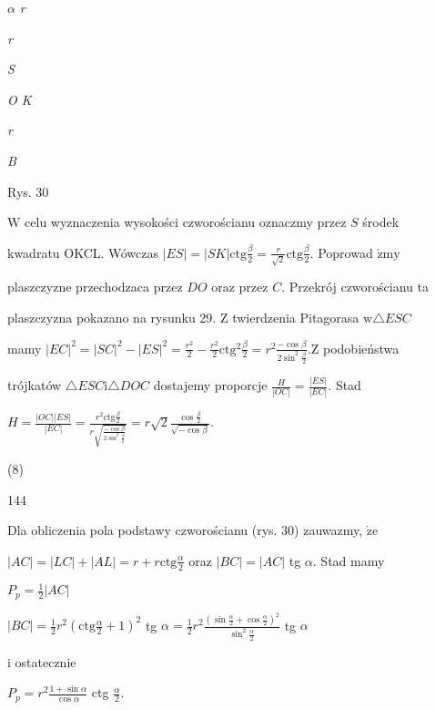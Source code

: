 \documentclass[a4paper,12pt]{article}
\begin{document}
$\alpha$  {\it r}

{\it r}

{\it S}

{\it O K}

{\it r}

{\it B}

Rys. 30

$\mathrm{W}$ celu wyznaczenia wysokości czworościanu oznaczmy przez $S$ środek

kwadratu OKCL. Wówczas $|ES|= |SK|\displaystyle \mathrm{c}\mathrm{t}\mathrm{g}\frac{\beta}{2}=\frac{r}{\sqrt{2}}\mathrm{c}\mathrm{t}\mathrm{g}\frac{\beta}{2}.$ Poprowad $\acute{\mathrm{z}}\mathrm{m}\mathrm{y}$

plaszczyzne przechodzaca przez $DO$ oraz przez $C$. Przekrój czworościanu ta

plaszczyzna pokazano na rysunku 29. $\mathrm{Z}$ twierdzenia Pitagorasa $\mathrm{w}\triangle ESC$

mamy $|EC|^{2}=|SC|^{2}-|ES|^{2}=\displaystyle \frac{r^{2}}{2}-\frac{r^{2}}{2}\mathrm{c}\mathrm{t}\mathrm{g}^{2}\frac{\beta}{2}=r^{2}\frac{-\cos\beta}{2\sin^{2}\frac{\beta}{2}}. \mathrm{Z}$ podobieństwa

trójkatów $\triangle ESC\mathrm{i}\triangle DOC$ dostajemy proporcje $\displaystyle \frac{H}{|OC|} = \displaystyle \frac{|ES|}{|EC|}$. Stad

$H=\displaystyle \frac{|OC||ES|}{|EC|}=\frac{r^{2}\mathrm{c}\mathrm{t}\mathrm{g}\frac{\beta}{2}}{r\sqrt{\frac{-\cos\beta}{2\sin^{2}\frac{\beta}{2}}}}=r\sqrt{2}\frac{\cos\frac{\beta}{2}}{\sqrt{-\cos\beta}}.$

(8)





144

Dla obliczenia pola podstawy czworościanu (rys. 30) zauwazmy, $\dot{\mathrm{z}}\mathrm{e}$

$|AC|=|LC|+|AL|=r+r\displaystyle \mathrm{c}\mathrm{t}\mathrm{g}\frac{\alpha}{2}$ oraz $|BC|=|AC|$ tg $\alpha$. Stad mamy

$P_{p}=\displaystyle \frac{1}{2}|AC|$

$|BC|=\displaystyle \frac{1}{2}r^{2}(\mathrm{c}\mathrm{t}\mathrm{g}\frac{\alpha}{2}+1)^{2}$ tg $\displaystyle \alpha=\frac{1}{2}r^{2}\frac{(\sin\frac{\alpha}{2}+\cos\frac{\alpha}{2})^{2}}{\sin^{2}\frac{\alpha}{2}}$ tg $\alpha$

$\mathrm{i}$ ostatecznie

$P_{p}=r^{2}\displaystyle \frac{1+\sin\alpha}{\cos\alpha}$ ctg $\displaystyle \frac{\alpha}{2}.$
\end{document}
